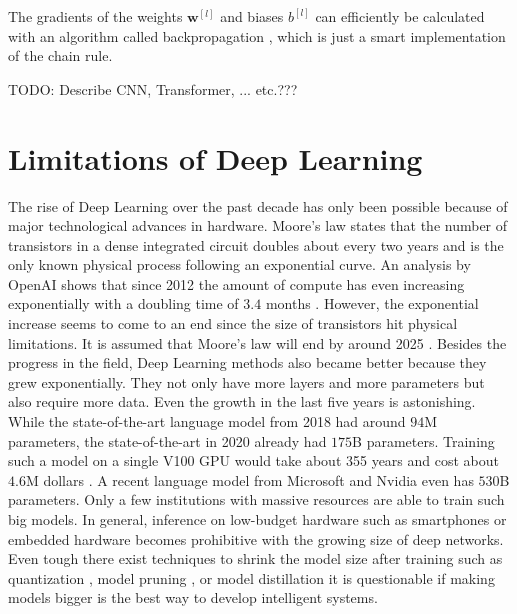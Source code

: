 The gradients of the weights \(\boldsymbol{w}^{[l]}\) and biases \(b^{[l]}\) can efficiently be calculated with an algorithm called backpropagation , which is just a smart implementation of the chain rule.

TODO: Describe CNN, Transformer, ... etc.???

\section{Limitations of Deep Learning}
The rise of Deep Learning over the past decade has only been possible because of major technological advances in hardware.
Moore’s law \cite{Moore_2006} states that the number of transistors in a dense integrated circuit doubles about every two years and is the only known physical process following an exponential curve.
An analysis by OpenAI shows that since 2012 the amount of compute has even increasing exponentially with a doubling time  of \(3.4\) months \cite{OpenAI_compute}.
However, the exponential increase seems to come to an end since the size of transistors hit physical limitations.
It is assumed that Moore's law will end by around 2025 .
Besides the progress in the field, Deep Learning methods also became better because they grew exponentially.
They not only have more layers and more parameters but also require more data.
Even the growth in the last five years is astonishing.
While the state-of-the-art language model from 2018  had around \(94\)M parameters, the state-of-the-art in 2020  already had \(175\)B parameters. Training such a model on a single V100 GPU would take about 355 years and cost about \(4.6\)M dollars \cite{Lambda_GPT3}.
A recent language model from Microsoft and Nvidia  even has \(530\)B parameters.
Only a few institutions with massive resources are able to train such big models.
In general, inference on low-budget hardware such as smartphones or embedded hardware becomes prohibitive with the growing size of deep networks.
Even tough there exist techniques to shrink the model size after training such as quantization \cite{Wu_Judd_Zhang_Isaev_Micikevicius_2020}, model pruning \cite{Choudhary_Mishra_Goswami_Sarangapani_2020}, or model distillation \cite{Hinton_Vinyals_Dean_2015} it is questionable if making models bigger is the best way to develop intelligent systems.


